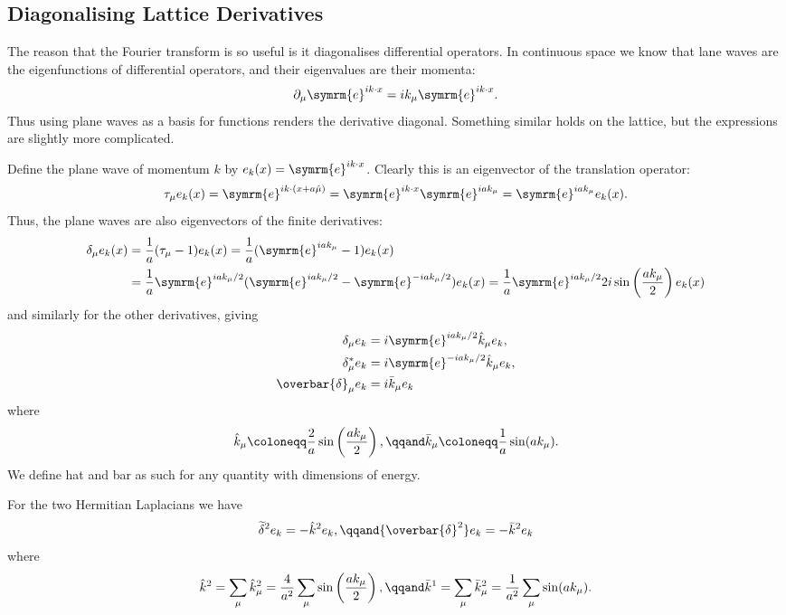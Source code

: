 \documentclass[fleqn]{NotesClass}
\newcommand{\e}{\symrm{e}}
\newcommand{\forwardDerivative}{\delta}
\newcommand{\backwardDerivative}{\delta^*}
\newcommand{\centralDerivative}{\overbar{\delta}}
\newcommand{\centralLaplacian}{{\overbar{\delta}^2}}
\newcommand{\mixedLaplacian}{{\widetilde{\delta}^2}}
\begin{document}
    \subsection{Diagonalising Lattice Derivatives}
    The reason that the Fourier transform is so useful is it diagonalises differential operators.
    In continuous space we know that lane waves are the eigenfunctions of differential operators, and their eigenvalues are their momenta:
    \begin{equation}
        \partial_\mu \e^{ik\cdot x} = ik_\mu\e^{ik\cdot x}.
    \end{equation}
    Thus using plane waves as a basis for functions renders the derivative diagonal.
    Something similar holds on the lattice, but the expressions are slightly more complicated.
    
    Define the plane wave of momentum \(k\) by \(e_k(x) = \e^{ik \cdot x}\).
    Clearly this is an eigenvector of the translation operator:
    \begin{equation}
        \tau_\mu e_k(x) = \e^{ik \cdot (x + a\hat{\mu})} = \e^{ik\cdot x}\e^{iak_\mu} = \e^{iak_\mu}e_k(x).
    \end{equation}
    Thus, the plane waves are also eigenvectors of the finite derivatives:
    \begin{align}
        \forwardDerivative_\mu e_k(x) &= \frac{1}{a}(\tau_\mu - 1)e_k(x) = \frac{1}{a}(\e^{iak_\mu} - 1)e_k(x)\\
        &= \frac{1}{a}\e^{iak_\mu/2}(\e^{iak_\mu/2} - \e^{-iak_\mu/2})e_k(x) = \frac{1}{a}\e^{iak_\mu/2}2i\sin\left( \frac{ak_\mu}{2} \right)e_k(x) \notag
    \end{align}
    and similarly for the other derivatives, giving
    \begin{align}
        \forwardDerivative_\mu e_k &= i\e^{iak_\mu/2}\hat{k}_\mu e_k,\\
        \backwardDerivative_\mu e_k &= i\e^{-iak_\mu/2}\hat{k}_\mu e_k,\\
        \centralDerivative_\mu e_k &=i\bar{k}_\mu e_k
    \end{align}
    where
    \begin{equation}
        \hat{k}_\mu \coloneqq \frac{2}{a}\sin\left( \frac{ak_\mu}{2} \right), \qqand \bar{k}_\mu \coloneqq \frac{1}{a}\sin(ak_\mu).
    \end{equation}
    We define hat and bar as such for any quantity with dimensions of energy.
    
    For the two Hermitian Laplacians we have
    \begin{equation}
        \mixedLaplacian e_k = -\hat{k}^2 e_k, \qqand \centralLaplacian e_k = -\bar{k}^2e_k
    \end{equation}
    where
    \begin{equation}
        \hat{k}^2 = \sum_\mu \hat{k}_\mu^2 = \frac{4}{a^2} \sum_{\mu} \sin\left( \frac{ak_\mu}{2} \right), \qqand \bar{k}^1 = \sum_\mu \bar{k}_\mu^2 = \frac{1}{a^2} \sum_{\mu} \sin(ak_\mu).
    \end{equation}
    
\end{document}
